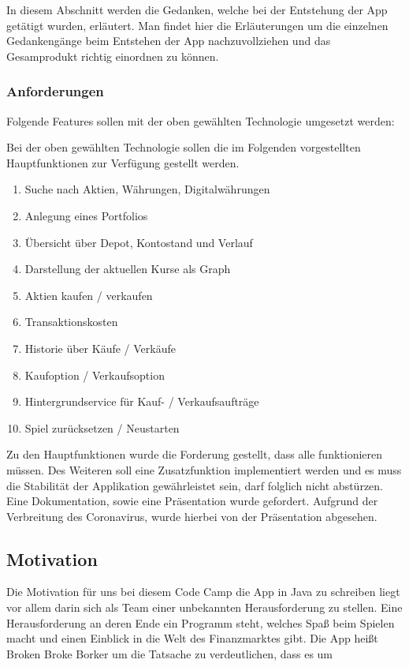 \documentclass[10pt]{scrartcl}
\begin{document}
In diesem Abschnitt werden die Gedanken, welche bei der Entstehung der App getätigt wurden, erläutert. Man findet hier die Erläuterungen um die einzelnen Gedankengänge beim Entstehen der App nachzuvollziehen und das Gesamprodukt richtig einordnen zu können.

\subsubsection{Anforderungen}
Folgende Features sollen mit der oben gewählten Technologie umgesetzt werden:

Bei der oben gewählten Technologie sollen die im Folgenden vorgestellten Hauptfunktionen zur Verfügung gestellt werden.

\begin{enumerate}
	\item 
	Suche nach Aktien, Währungen, Digitalwährungen
	\item
	Anlegung eines Portfolios
	\item
	Übersicht über Depot, Kontostand und Verlauf
	\item
	Darstellung der aktuellen Kurse als Graph
	\item
	Aktien kaufen / verkaufen
	\item
	Transaktionskosten
	\item
	Historie über Käufe / Verkäufe
	\item
	Kaufoption / Verkaufsoption
	\item
	Hintergrundservice für Kauf- / Verkaufsaufträge
	\item
	Spiel zurücksetzen / Neustarten
\end{enumerate}

Zu den Hauptfunktionen wurde die Forderung gestellt, dass alle funktionieren müssen. Des Weiteren soll eine Zusatzfunktion implementiert werden und es muss die Stabilität der Applikation gewährleistet sein, darf folglich nicht abstürzen. Eine Dokumentation, sowie eine Präsentation wurde gefordert. Aufgrund der Verbreitung des Coronavirus, wurde hierbei von der Präsentation abgesehen.

\subsection{Motivation}
Die Motivation für uns bei diesem Code Camp die App in Java zu schreiben liegt vor allem darin sich als Team einer unbekannten Herausforderung zu stellen. Eine Herausforderung an deren Ende ein Programm steht, welches Spaß beim Spielen macht und einen Einblick in die Welt des Finanzmarktes gibt. Die App heißt Broken Broke Borker um die Tatsache zu verdeutlichen, dass es um 
\end{document}
